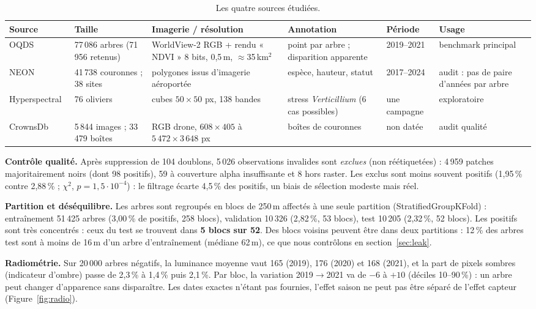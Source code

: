 \documentclass[10pt,a4paper,twocolumn]{article}
\begin{document}
\begin{table}[t]
\centering\small
\caption{Les quatre sources étudiées.}
\label{tab:datasets}
\setlength{\tabcolsep}{4pt}
\begin{tabular}{@{}lL{2.7cm}L{3.8cm}L{3.4cm}L{1.6cm}L{2.5cm}@{}}
\toprule
Source & Taille & Imagerie / résolution & Annotation & Période & Usage \\
\midrule
OQDS~\cite{oqds} & 77\,086 arbres (71\,956 retenus) & WorldView-2 RGB + rendu « NDVI » 8 bits, 0,5\,m, $\approx$35\,km$^2$ & point par arbre ; disparition apparente & 2019--2021 & benchmark principal \\
NEON~\cite{neon} & 41\,738 couronnes ; 38 sites & polygones issus d'imagerie aéroportée & espèce, hauteur, statut & 2017--2024 & audit : pas de paire d'années par arbre \\
Hyperspectral~\cite{hyper} & 76 oliviers & cubes $50\times50$ px, 138 bandes & stress \emph{Verticillium} (6 cas possibles) & une campagne & exploratoire \\
CrownsDb~\cite{crowns} & 5\,844 images ; 33\,479 boîtes & RGB drone, $608\times405$ à $5\,472\times3\,648$ px & boîtes de couronnes & non datée & audit qualité \\
\bottomrule
\end{tabular}
\end{table}

\textbf{Contrôle qualité.} Après suppression de 104 doublons, 5\,026 observations invalides sont \emph{exclues} (non
réétiquetées) : 4\,959 patches majoritairement noirs (dont 98 positifs), 59 à couverture alpha insuffisante et 8 hors raster.
Les exclus sont moins souvent positifs (1,95\,\% contre 2,88\,\% ; $\chi^2$, $p=1{,}5\cdot10^{-4}$) : le filtrage écarte
4,5\,\% des positifs, un biais de sélection modeste mais réel.

\textbf{Partition et déséquilibre.} Les arbres sont regroupés en blocs de 250\,m affectés à une seule partition
(StratifiedGroupKFold) : entraînement 51\,425 arbres (3,00\,\% de positifs, 258 blocs), validation 10\,326 (2,82\,\%, 53 blocs),
test 10\,205 (2,32\,\%, 52 blocs). Les positifs sont très concentrés : ceux du test se trouvent dans \textbf{5 blocs sur 52}. Des
blocs voisins peuvent être dans deux partitions : 12\,\% des arbres test sont à moins de 16\,m d'un arbre d'entraînement
(médiane 62\,m), ce que nous contrôlons en section~\ref{sec:leak}.

\textbf{Radiométrie.} Sur 20\,000 arbres négatifs, la luminance moyenne vaut 165 (2019), 176 (2020) et 168 (2021), et la part
de pixels sombres (indicateur d'ombre) passe de 2,3\,\% à 1,4\,\% puis 2,1\,\%. Par bloc, la variation 2019$\to$2021 va de $-6$
à $+10$ (déciles 10--90\,\%) : un arbre peut changer d'apparence sans disparaître. Les dates exactes n'étant pas fournies,
l'effet saison ne peut pas être séparé de l'effet capteur (Figure~\ref{fig:radio}).
\end{document}
